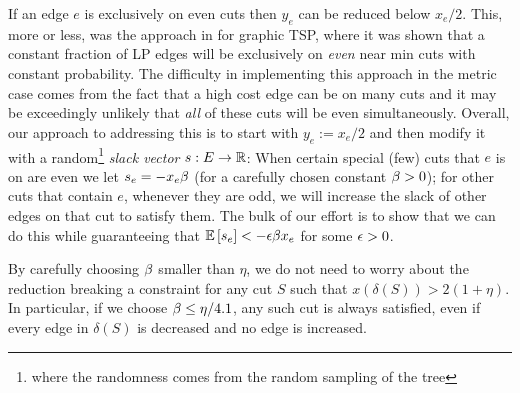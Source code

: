 If an edge $e$  is exclusively on even cuts then $y_e$ can be reduced below $x_e/2$. This, more or less, was the approach in \cite{OSS11} for graphic TSP, where it was shown that a constant fraction of LP edges will be exclusively on \textit{even} near min cuts with constant probability.
The difficulty in implementing this approach in the metric case comes from the fact that a high cost edge can be on many cuts and it may be exceedingly unlikely that {\em all} of these cuts will be even simultaneously. Overall, our approach to addressing this is  to start with $y_e:= x_e/2$ and then modify it with a random\footnote{where the randomness comes from the random sampling of the tree}  {\em slack vector} $s:E\to\mathbb{R}$: When  certain special (few) cuts that $e$ is on are even we let $s_e=-x_e \beta$ (for a carefully chosen constant $\beta>0$); for other cuts that contain $e$, whenever they are odd, we will increase the slack of other edges on that cut to satisfy them. The bulk of our effort is to show that we can do this while guaranteeing that ${\mathbb{E}}\left[s_e\right]<-{\epsilon} \beta x_e$ for some ${\epsilon}>0$.


By carefully choosing $\beta$ smaller than $\eta$, we do not need to worry about the reduction breaking a constraint for any cut $S$ such that $x(\delta(S)) > 2(1+ \eta)$. In particular, if we choose $\beta \le \eta/4.1$, any such cut is always satisfied, even if every edge in $\delta(S)$ is decreased and no edge is increased.

